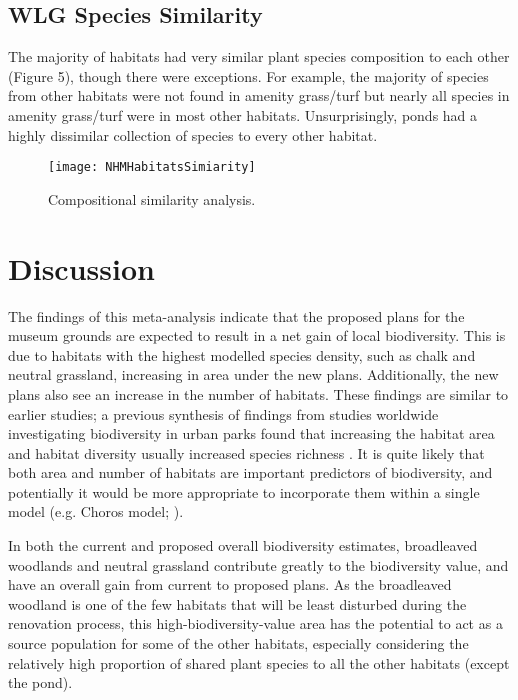 \subsection{WLG Species Similarity}
The majority of habitats had very similar plant species composition to each other (Figure 5), though there were exceptions. For example, the majority of species from other habitats were not found in amenity grass/turf but nearly all species in amenity grass/turf were in most other habitats. Unsurprisingly, ponds had a highly dissimilar collection of species to every other habitat.

\begin{figure}[t]
	\centering
	\texttt{[image: NHMHabitatsSimiarity]}
	\caption{Compositional similarity analysis.}
   	 \label{fig:wlgsimilarity}
\end{figure}

\section{Discussion}
The findings of this meta-analysis indicate that the proposed plans for the museum grounds are expected to result in a net gain of local biodiversity. This is due to habitats with the highest modelled species density, such as chalk and neutral grassland, increasing in area under the new plans. Additionally, the new plans also see an increase in the number of habitats.  These findings are similar to earlier studies; a previous synthesis of findings from studies worldwide investigating biodiversity in urban parks found that increasing the habitat area and habitat diversity usually increased species richness \citep{Nielsen:2014ue}.  It is quite likely that both area and number of habitats are important predictors of biodiversity, and potentially it would be more appropriate to incorporate them within a single model (e.g. Choros model; \citealt{Triantis:2003jb}).

In both the current and proposed overall biodiversity estimates, broadleaved woodlands and neutral grassland contribute greatly to the biodiversity value, and have an overall gain from current to proposed plans. As the broadleaved woodland is one of the few habitats that will be least disturbed during the renovation process, this high-biodiversity-value area has the potential to act as a source population for some of the other habitats, especially considering the relatively high proportion of shared plant species to all the other habitats (except the pond).

